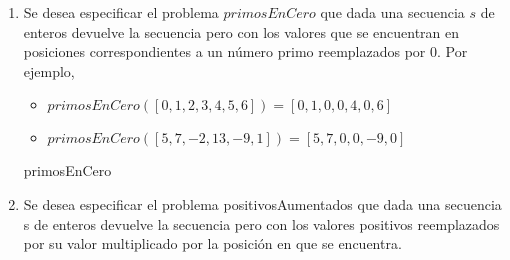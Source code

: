\begin{enumerate}[label=\alph*)]
            \begin{proc}{ordenarYBuscarMayor}{\Inout s: \TLista{\ent}}{\ent}



            \end{proc}

      \item Se desea especificar el problema $primosEnCero$ que dada una secuencia $s$ de enteros devuelve la secuencia pero con los valores que se encuentran en posiciones correspondientes a un número primo reemplazados por 0. Por ejemplo,

            \begin{itemize}
                  \item $primosEnCero([0,1,2,3,4,5,6]) = [0,1,0,0,4,0,6]$
                  \item $primosEnCero([5,7,-2,13,-9,1]) = [5,7,0,0,-9,0]$
            \end{itemize}

            \begin{proc}{primosEnCero}{\In \TLista{\ent}}{\TLista{\ent}}

            \end{proc}

      \item Se desea especificar el problema positivosAumentados que dada una secuencia s de enteros devuelve la secuencia pero con los valores positivos reemplazados por su valor multiplicado por la posición en que se encuentra.


\end{enumerate}
